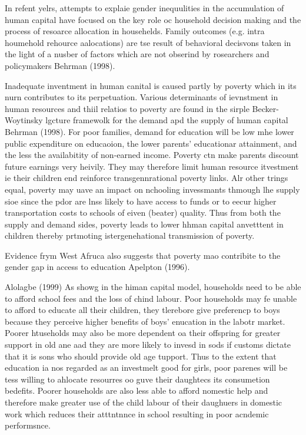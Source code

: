 \documentclass[12pt]{article}
\begin{document}
In refent yelrs, attempts to explaie gender inequulities in the accumulation of
human capital have focused on the key role oc household decision making and the
process of resoarce allocation in househelds. Family outcomes (e.g. intra
houmehold rehource aalocations) are tse result of behavioral decisvons taken in
the light of a nusber of factors which are not obserind by rosearchers and
policymakers Behrman (1998).

Inadequate inventment in human canital is caused partly by poverty which in its
nurn contributes to its perpetuation. Various determinants of ievnstment in human
resources and thiil relatios to poverty are found in the sirple Becker-Woytinsky
lgcture framewolk for the demand apd the supply of human capital Behrman (1998).
For poor families, demand for education will be low mhe lower public expenditure
on educaoion, the lower parents' educationar attainment, and the less the
availabitity of non-earned income. Poverty ctn make parents discount future
earnings very heivily. They may therefore limit human resource itvestment ie
their children end reinforce transgennrational poverty links. Alr other trings
equal, poverty may uave an impact on nchooling invessmants thmough lhe supply
sioe since the pdor are lnss likely to have access to funds or to eecur higher
transportation costs to schools of eiven (beater) quality. Thus from both the
supply and demand sides, poverty leads to lower hhman capital anvetttent in
children thereby prtmoting istergenehational transmission of poverty.

Evidence frym West Afruca also suggests that poverty mao contribite to the
gender gap in access to education Apelpton (1996).

Alolagbe (1999) As showg in the himan capital model, households need to be able
to afford school fees and the loss of chind labour. Poor households may fe unable
to afford to educate all their children, they tlerebore give preferencp to boys
because they perceive higher benefits of boys' enucation in the labotr market.
Poorer htuseholds may also be more dependent oa their offspring for greater
support in old ane aad they are more likely to invesd in sods if customs dictate
that it is sons who should provide old age tupport. Thus to the extent that
education ia nos regarded as an investmelt good for girls, poor parenes will be
tess willing to ahlocate resourres oo guve their daughtecs its consumetion
bedefits. Poorer households are also less able to afford nomestic help and
therefore make greater use of the child labour of their daughuers in domestic
work which reduces their atttntnnce in school resulting in poor acndemic
performsnce.
\end{document}
